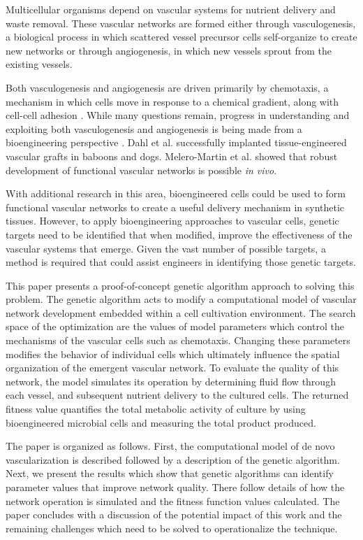 Multicellular organisms depend on vascular systems for nutrient delivery and waste removal\cite{delindavis:bloodevolution}. These vascular networks are formed either through vasculogenesis, a biological process in which scattered vessel precursor cells self-organize to create new networks or through angiogenesis, in which new vessels sprout from the existing vessels.

Both vasculogenesis and angiogenesis are driven primarily by chemotaxis, a mechanism in which cells move in response to a chemical gradient, along with cell-cell adhesion \cite{delindavis:Merks2008ContactInhibited}. While many questions remain, progress in understanding and exploiting both vasculogenesis and angiogenesis is being made from a bioengineering perspective  \cite{Kaully2009VascularizationThe} \cite{Lovett2009Vascularization}. Dahl et al. \cite{delindavis:vascularnetworksinorgandevelopment} successfully implanted tissue-engineered vascular grafts in baboons and dogs. Melero-Martin et al. \cite{delindavis:bioengineeredvascularnetworks} showed that robust development of functional vascular networks is possible \textit{in vivo}.

With additional research in this area, bioengineered cells could be used to form functional vascular networks to create a useful delivery mechanism in synthetic tissues. However, to apply bioengineering approaches to vascular cells, genetic targets need to be identified that when modified, improve the effectiveness of the vascular systems that emerge. Given the vast number of possible targets, a method is required that could assist engineers in identifying those genetic targets.

This paper presents a proof-of-concept genetic algorithm approach to solving this problem. The genetic algorithm acts to modify a computational model of vascular network development embedded within a cell cultivation environment. The search space of the optimization are the values of model parameters which control the mechanisms of the vascular cells such as chemotaxis. Changing these parameters modifies the behavior of individual cells which ultimately influence the spatial organization of the emergent vascular network. To evaluate the quality of this network, the model simulates its operation by determining fluid flow through each vessel, and subsequent nutrient delivery to the cultured cells. The returned fitness value quantifies the total metabolic activity of culture by using bioengineered microbial cells and measuring the total product produced.

The paper is organized as follows. First, the computational model of de novo vascularization is described followed by a description of the genetic algorithm. Next, we present the results which show that genetic algorithms can identify parameter values that improve network quality. There follow details of how the network operation is simulated and the fitness function values calculated. The paper concludes with a discussion of the potential impact of this work and the remaining challenges which need to be solved to operationalize the technique.




